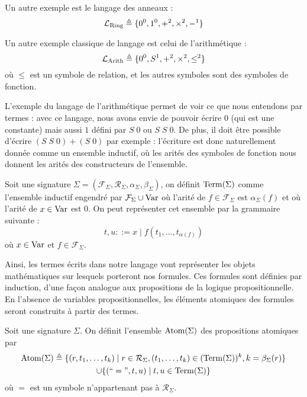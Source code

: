 \begin{example}
  Un autre exemple est le langage des anneaux :
  \[\mathcal L_{\mathrm{Ring}}\triangleq \{0^0,1^0,+^2,\times^2,-^1\}\]
\end{example}

\begin{example}
  Un autre exemple classique de langage est celui de l'arithmétique :
  \[\mathcal L_{\mathrm{Arith}}\triangleq \{0^0, S^1, +^2,\times^2,\leq^2\}\]
  où $\leq$ est un symbole de relation, et les autres symboles sont des symboles
  de fonction.
\end{example}

L'exemple du langage de l'arithmétique permet de voir ce que nous entendons par
termes : avec ce langage, nous avons envie de pouvoir écrire $0$ (qui est une
constante) mais aussi $1$ défini par $S\;0$ ou $S\;S\;0$. De plus, il doit être
possible d'écrire $(S\;S\;0) + (S\;0)$ par exemple : l'écriture est donc
naturellement donnée comme un ensemble inductif, où les arités des symboles de
fonction nous donnent les arités des constructeurs de l'ensemble.

\begin{definition}[Termes]
  Soit une signature
  $\Sigma = (\mathcal F_\Sigma,\mathcal R_\Sigma, \alpha_\Sigma,\beta_\Sigma)$,
  on définit $\operatorname{Term}(\Sigma)$ comme l'ensemble inductif engendré par
  $\mathcal F_\Sigma\cup\operatorname{Var}$ où l'arité de $f\in\mathcal F_\Sigma$ est
  $\alpha_\Sigma(f)$ et où l'arité de $x\in \operatorname{Var}$ est $0$. On peut représenter
  cet ensemble par la grammaire suivante :
  \[t,u ::= x \mid f(t_1,\ldots,t_{\alpha(f)})\]
  où $x\in \operatorname{Var}$ et $f\in \mathcal F_\Sigma$.
\end{definition}

Ainsi, les termes écrits dans notre langage vont représenter les objets
mathématiques sur lesquels porteront nos formules. Ces formules sont définies par
induction, d'une façon analogue aux propositions de la logique propositionnelle.
En l'absence de variables propositionnelles, les éléments atomiques des formules
seront construits à partir des termes.

\begin{definition}
  Soit une signature $\Sigma$. On définit l'ensemble $\operatorname{Atom}(\Sigma)$ des
  propositions atomiques par
  \begin{multline*}
    \operatorname{Atom}(\Sigma) \triangleq \{(r,t_1,\ldots,t_k)\mid r\in\mathcal R_\Sigma,
    (t_1,\ldots,t_k) \in (\operatorname{Term}(\Sigma))^k, k = \beta_\Sigma(r)\}\\
    \cup\{(``=",t,u)\mid t,u\in \operatorname{Term}(\Sigma)\}
  \end{multline*}
  où $=$ est un symbole n'appartenant pas à $\mathcal R_\Sigma$.
\end{definition}

